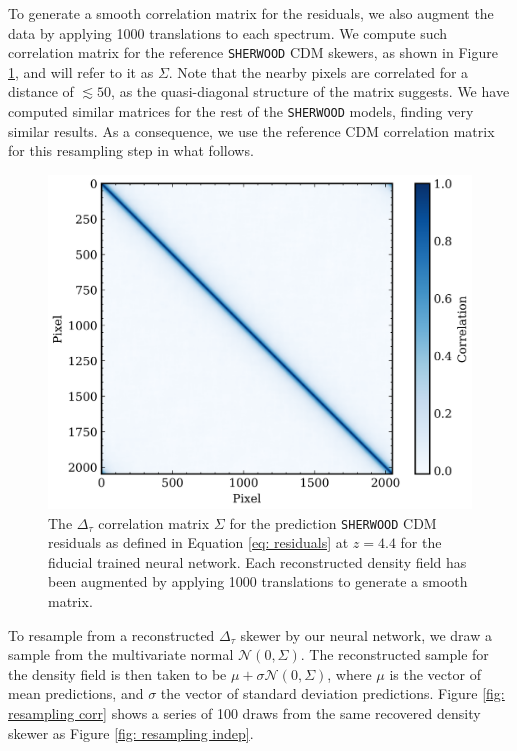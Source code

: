 To generate a smooth correlation matrix for the residuals, we also augment the data by applying 1000 translations to each spectrum. We compute such correlation matrix for the reference \texttt{SHERWOOD} CDM skewers, as shown in Figure \ref{fig: corr mat cdm}, and will refer to it as $\Sigma$. Note that the nearby pixels are correlated for a distance of $\lesssim 50$, as the quasi-diagonal structure of the matrix suggests. We have computed similar matrices for the rest of the \texttt{SHERWOOD} models, finding very similar results. As a consequence, we use the reference CDM correlation matrix for this resampling step in what follows.


\begin{figure}
    \centering
    \includegraphics[width=0.85\linewidth]{img/ML/cov_mat_imprs.png}
    \caption{The $\Delta_\tau$ correlation matrix $\Sigma$ for the prediction \texttt{SHERWOOD} CDM residuals as defined in Equation \ref{eq: residuals} at $z=4.4$ for the fiducial trained neural network. Each reconstructed density field has been augmented by applying 1000 translations to generate a smooth matrix.}
    \label{fig: corr mat cdm}
\end{figure}

To resample from a reconstructed $\Delta_\tau$ skewer by our neural network, we draw a sample from the multivariate normal $\mathcal{N}(0,\Sigma)$. The reconstructed sample for the density field is then taken to be $\mu+\sigma \mathcal{N}(0,\Sigma)$, where $\mu$ is the vector of mean predictions, and $\sigma$ the vector of standard deviation predictions. Figure \ref{fig: resampling corr} shows a series of 100 draws from the same recovered density skewer as Figure \ref{fig: resampling indep}.

